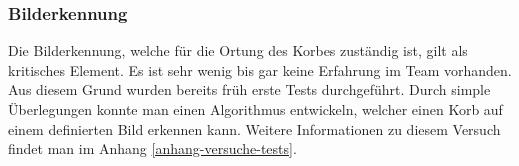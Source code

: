 \subsubsection{Bilderkennung}
Die Bilderkennung, welche für die Ortung des Korbes zuständig ist, gilt als kritisches Element. Es ist sehr wenig bis gar keine Erfahrung im Team vorhanden. Aus diesem Grund wurden bereits früh erste Tests durchgeführt. Durch simple Überlegungen konnte man einen Algorithmus entwickeln, welcher einen Korb auf einem definierten Bild erkennen kann. Weitere Informationen zu diesem Versuch findet man im Anhang \ref{anhang-versuche-tests}.